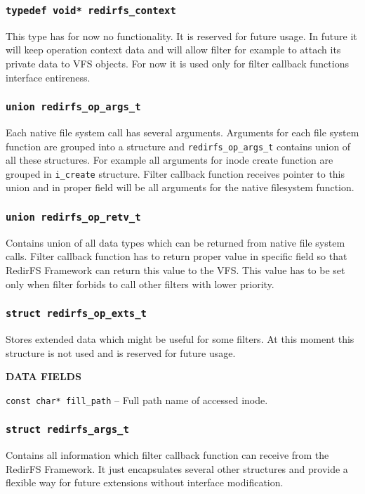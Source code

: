 \subsubsection{\texttt{typedef void* redirfs\_context}}
This type has for now no functionality. It is reserved for future usage. In future it
will keep operation context data and will allow filter for example to attach its private
data to VFS objects. For now it is used only for filter callback functions interface
entireness.

\subsubsection{\texttt{union redirfs\_op\_args\_t}}
Each native file system call has several arguments. Arguments for each file system
function are grouped into a structure and \texttt{redirfs\_op\_args\_t} contains union
of all these structures. For example all arguments for inode create function are
grouped in \texttt{i\_create} structure. Filter callback function receives pointer to
this union and in proper field will be all arguments for the native filesystem
function.

\subsubsection{\texttt{union redirfs\_op\_retv\_t}}
Contains union of all data types which can be returned from native file system calls.
Filter callback function has to return proper value in specific field so that RedirFS
Framework can return this value to the VFS. This value has to be set only when filter
forbids to call other filters with lower priority.

\subsubsection{\texttt{struct redirfs\_op\_exts\_t}}
Stores extended data which might be useful for some filters. At this moment this
structure is not used and is reserved for future usage.
\begin{list}{}{}
	\item \textbf{DATA FIELDS}
		\begin{list}{}{}
			\item \texttt{const char* fill\_path} -- Full path name of
				accessed inode.
		\end{list}
\end{list}

\subsubsection{\texttt{struct redirfs\_args\_t}}
Contains all information which filter callback function can receive from the RedirFS
Framework. It just encapsulates several other structures and provide a flexible way for
future extensions without interface modification.  

